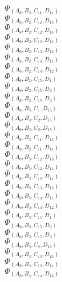 \documentclass[14pt]{article}
\begin{document}
    $\Phi_{({A}_{6}, {B}_{2}, {C}_{11}, {D}_{14})}$ \\ 
    $\Phi_{({A}_{6}, {B}_{2}, {C}_{12}, {D}_{13})}$ \\ 
    $\Phi_{({A}_{6}, {B}_{2}, {C}_{12}, {D}_{14})}$ \\ 
    $\Phi_{({A}_{6}, {B}_{2}, {C}_{13}, {D}_{11})}$ \\ 
    $\Phi_{({A}_{6}, {B}_{2}, {C}_{13}, {D}_{12})}$ \\ 
    $\Phi_{({A}_{6}, {B}_{2}, {C}_{14}, {D}_{11})}$ \\ 
    $\Phi_{({A}_{6}, {B}_{2}, {C}_{14}, {D}_{12})}$ \\ 
    $\Phi_{({A}_{6}, {B}_{2}, {C}_{15}, {D}_{1})}$ \\ 
    $\Phi_{({A}_{6}, {B}_{2}, {C}_{15}, {D}_{2})}$ \\ 
    $\Phi_{({A}_{6}, {B}_{2}, {C}_{15}, {D}_{3})}$ \\ 
    $\Phi_{({A}_{6}, {B}_{3}, {C}_{1}, {D}_{15})}$ \\ 
    $\Phi_{({A}_{6}, {B}_{3}, {C}_{2}, {D}_{15})}$ \\ 
    $\Phi_{({A}_{6}, {B}_{3}, {C}_{3}, {D}_{15})}$ \\ 
    $\Phi_{({A}_{6}, {B}_{3}, {C}_{11}, {D}_{13})}$ \\ 
    $\Phi_{({A}_{6}, {B}_{3}, {C}_{11}, {D}_{14})}$ \\ 
    $\Phi_{({A}_{6}, {B}_{3}, {C}_{12}, {D}_{13})}$ \\ 
    $\Phi_{({A}_{6}, {B}_{3}, {C}_{12}, {D}_{14})}$ \\ 
    $\Phi_{({A}_{6}, {B}_{3}, {C}_{13}, {D}_{11})}$ \\ 
    $\Phi_{({A}_{6}, {B}_{3}, {C}_{13}, {D}_{12})}$ \\ 
    $\Phi_{({A}_{6}, {B}_{3}, {C}_{14}, {D}_{11})}$ \\ 
    $\Phi_{({A}_{6}, {B}_{3}, {C}_{14}, {D}_{12})}$ \\ 
    $\Phi_{({A}_{6}, {B}_{3}, {C}_{15}, {D}_{1})}$ \\ 
    $\Phi_{({A}_{6}, {B}_{3}, {C}_{15}, {D}_{2})}$ \\ 
    $\Phi_{({A}_{6}, {B}_{3}, {C}_{15}, {D}_{3})}$ \\ 
    $\Phi_{({A}_{6}, {B}_{4}, {C}_{5}, {D}_{15})}$ \\ 
    $\Phi_{({A}_{6}, {B}_{4}, {C}_{13}, {D}_{13})}$ \\ 
    $\Phi_{({A}_{6}, {B}_{4}, {C}_{13}, {D}_{14})}$ \\ 
    $\Phi_{({A}_{6}, {B}_{4}, {C}_{14}, {D}_{13})}$ \\ 
\end{document}
